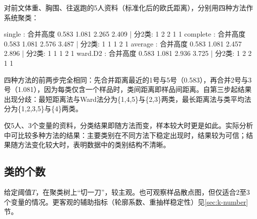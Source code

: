 \begin{sikao}[类间距离定义对聚类结果的影响]
对前文体重、胸围、往返跑的5人资料（标准化后的欧氏距离），分别用四种方法作系统聚类：
\par\noindent{}
\begin{routput}
single : 合并高度 0.583 1.081 2.265 2.409  | 分2类: 1 2 2 1 1 
complete : 合并高度 0.583 1.081 2.576 3.487  | 分2类: 1 1 1 2 1 
average : 合并高度 0.583 1.081 2.457 2.896  | 分2类: 1 1 1 2 1 
ward.D2 : 合并高度 0.583 1.081 2.936 3.725  | 分2类: 1 2 2 1 1 
\end{routput}
四种方法的前两步完全相同：先合并距离最近的1号与5号（0.583），再合并2号与3号（1.081），因为每类仅含一个样品时，类间距离即样品间距离。自第三步起结果出现分歧：最短距离法与Ward法分为\{1,4,5\}与\{2,3\}两类，最长距离法与类平均法分为\{1,2,3,5\}与\{4\}两类。

仅5人、3个变量的资料，分类结果即随方法而变，样本较大时更是如此。实际分析中可比较多种方法的结果：主要类别在不同方法下稳定出现时，结果较为可信；结果随方法变化较大时，表明数据中的类别结构不清晰。
\end{sikao}
\subsection{类的个数}
给定阈值$T$，在聚类树上“切一刀”，较主观。也可观察样品散点图，但仅适合2至3个变量的情况。更客观的辅助指标（轮廓系数、重抽样稳定性）见\ref{sec:k-number}节。
